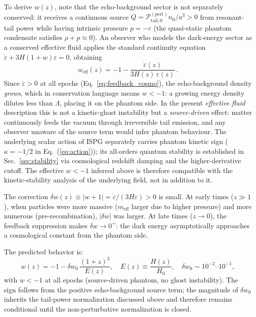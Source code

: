 \documentclass[aps,prd,onecolumn,superscriptaddress,nofootinbib,showpacs,12pt,notitlepage]{revtex4-2}
\newcommand{\meff}{m_{\mathrm{eff}}}
\begin{document}
To derive $w(z)$, note that the echo-background sector is not
separately conserved: it receives a continuous source
$Q =
\mathcal{P}_{\mathrm{tail},0}^{\mathrm{(pert)}}n_0/a^3 > 0$
from resonant-tail power
while having intrinsic pressure $p = -\varepsilon$
(the quasi-static phantom condensate satisfies
$\rho + p \approx 0$).  An observer who models the
dark-energy sector as a conserved effective fluid
applies the standard continuity equation
$\dot{\varepsilon} + 3H(1+w)\varepsilon = 0$, obtaining
\begin{equation}\label{eq:w_eff}
  w_{\mathrm{eff}}(z)
  = -1 - \frac{\dot{\varepsilon}(z)}
    {3H(z)\,\varepsilon(z)}\,.
\end{equation}
Since $\dot{\varepsilon} > 0$ at all epochs
(Eq.~\ref{eq:feedback_cosmo}), the echo-background density
\emph{grows}, which in conservation language means
$w < -1$: a growing energy density dilutes less than
$\Lambda$, placing it on the phantom side.  In the
present \emph{effective fluid} description this is not
a kinetic-ghost instability but a \emph{source-driven}
effect: matter continuously feeds the vacuum through
irreversible tail emission, and any observer unaware
of the source term would infer phantom behaviour.  The
underlying scalar action of ISPG separately carries
phantom kinetic sign ($\kappa = -1/2$ in
Eq.~(\ref{eq:action})); its all-orders quantum
stability is established in Sec.~\ref{sec:stability}
via cosmological redshift damping and the higher-derivative
cutoff.  The effective $w<-1$ inferred above is therefore
compatible with the kinetic-stability analysis of the
underlying field, not in addition to it.

The correction $\delta w(z) \equiv |w + 1|
= \dot{\varepsilon}/(3H\varepsilon) > 0$ is small.
At early times ($z \gg 1$), when particles
were more massive ($\meff$ larger due to higher pressure)
and more numerous (pre-recombination), $|\delta w|$ was larger.
At late times ($z \to 0$), the feedback suppression makes
$\delta w \to 0^{+}$: the dark energy asymptotically
approaches a cosmological constant from the phantom side.

The predicted behavior is:
\begin{equation}\label{eq:w_prediction}
  \boxed{
  w(z) = -1 - \delta w_0\,\frac{(1+z)^{3}}{E(z)},
  \quad E(z) \equiv \frac{H(z)}{H_0},
  \quad \delta w_0 \sim 10^{-2}\text{--}10^{-1},
  }
\end{equation}
with $w < -1$ at all epochs (source-driven phantom,
no ghost instability).  The sign follows from the positive
echo-background source term; the magnitude of $\delta w_0$
inherits the tail-power normalization discussed above and
therefore remains conditional until the non-perturbative
normalization is closed.
\end{document}
